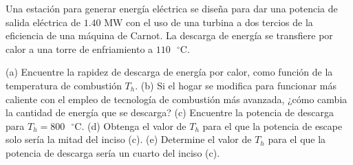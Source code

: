 \item Una estación para generar energía eléctrica se diseña para dar una potencia de salida eléctrica de $1.40\text{ MW}$ con el uso de una turbina a dos tercios de la eficiencia de una máquina de Carnot. La descarga de energía se transfiere por calor a una torre de enfriamiento a $110\text{ }^\circ\text{C}$. 

(a) Encuentre la rapidez de descarga de energía por calor, como función de la temperatura de combustión $T_h$. 
(b) Si el hogar se modifica para funcionar más caliente con el empleo de tecnología de combustión más avanzada, ¿cómo cambia la cantidad de energía que se descarga? 
(c) Encuentre la potencia de descarga para $T_h = 800\text{ }^\circ\text{C}$. 
(d) Obtenga el valor de $T_h$ para el que la potencia de escape solo sería la mitad del inciso (c). 
(e) Determine el valor de $T_h$ para el que la potencia de descarga sería un cuarto del inciso (c).

